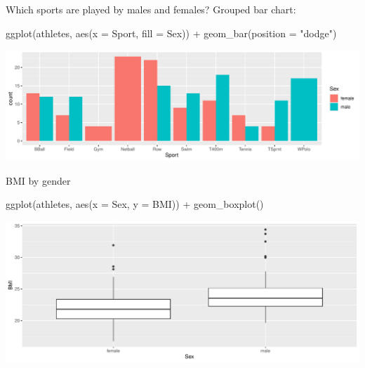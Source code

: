 \documentclass[
  ignorenonframetext,
]{beamer}
\newenvironment{Shaded}{\begin{snugshade}}{\end{snugshade}}
\newcommand{\AttributeTok}[1]{\textcolor[rgb]{0.40,0.45,0.13}{#1}}
\newcommand{\FunctionTok}[1]{\textcolor[rgb]{0.28,0.35,0.67}{#1}}
\newcommand{\NormalTok}[1]{\textcolor[rgb]{0.00,0.23,0.31}{#1}}
\newcommand{\SpecialCharTok}[1]{\textcolor[rgb]{0.37,0.37,0.37}{#1}}
\newcommand{\StringTok}[1]{\textcolor[rgb]{0.13,0.47,0.30}{#1}}
\begin{document}
\begin{frame}[fragile]{Which sports are played by males and females?}
\label{which-sports-are-played-by-males-and-females}
Grouped bar chart:

\begin{Shaded}
\begin{Highlighting}[]
\FunctionTok{ggplot}\NormalTok{(athletes, }\FunctionTok{aes}\NormalTok{(}\AttributeTok{x =}\NormalTok{ Sport, }\AttributeTok{fill =}\NormalTok{ Sex)) }\SpecialCharTok{+}
  \FunctionTok{geom\_bar}\NormalTok{(}\AttributeTok{position =} \StringTok{"dodge"}\NormalTok{)}
\end{Highlighting}
\end{Shaded}

\includegraphics{graphs_files/figure-beamer/graphs-R-6-1.pdf}
\end{frame}

\begin{frame}[fragile]{BMI by gender}
\label{bmi-by-gender}
\begin{Shaded}
\begin{Highlighting}[]
\FunctionTok{ggplot}\NormalTok{(athletes, }\FunctionTok{aes}\NormalTok{(}\AttributeTok{x =}\NormalTok{ Sex, }\AttributeTok{y =}\NormalTok{ BMI)) }\SpecialCharTok{+} \FunctionTok{geom\_boxplot}\NormalTok{() }
\end{Highlighting}
\end{Shaded}

\includegraphics{graphs_files/figure-beamer/graphs-R-7-1.pdf}
\end{frame}
\end{document}
